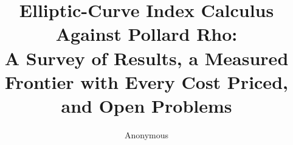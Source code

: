 \documentclass[10pt,a4paper]{article}
\title{Elliptic-Curve Index Calculus Against Pollard Rho:\\[4pt]
       {\large A Survey of Results, a Measured Frontier with Every Cost Priced,\\
       and Open Problems}}
\author{Anonymous}
\date{}
\theoremstyle{remark}
\theoremstyle{definition}
\begin{document}
\maketitle

\begin{abstract}

\end{abstract}

\tableofcontents
\bigskip















\appendix




\end{document}
